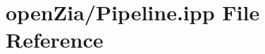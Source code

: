\hypertarget{_pipeline_8ipp}{}\section{open\+Zia/\+Pipeline.ipp File Reference}
\label{_pipeline_8ipp}
